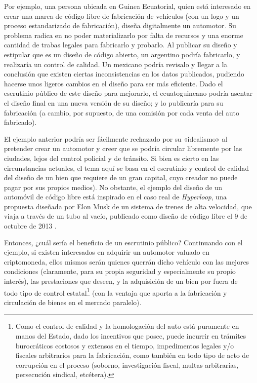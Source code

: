 \documentclass[12pt,a4paper]{article}
\begin{document}
Por ejemplo, una persona ubicada en Guinea Ecuatorial, quien está interesado en crear una marca de código libre de fabricación de vehículos (con un logo y un proceso estandarizado de fabricación), diseña digitalmente un automotor. Su problema radica en no poder materializarlo por falta de recursos y una enorme cantidad de trabas legales para fabricarlo y probarlo. Al publicar su diseño y estipular que es un diseño de código abierto, un argentino podría fabricarlo, y realizaría un control de calidad. Un mexicano podría revisalo y llegar a la conclusión que existen ciertas inconsistencias en los datos publicados, pudiendo hacerse unos ligeros cambios en el diseño para ser más eficiente. Dado el escrutinio público de este diseño para mejorarlo, el ecuatoguineano podría asentar el diseño final en una nueva versión de su diseño; y lo publicaría para su fabricación (a cambio, por supuesto, de una comisión por cada venta del auto fabricado).

El ejemplo anterior podría ser fácilmente rechazado por su «idealismo» al pretender crear un automotor y creer que se podría circular libremente por las ciudades, lejos del control policial y de tránsito. Si bien es cierto en las circunstancias actuales, el tema aquí se basa en el escrutinio y control de calidad del diseño de un bien que requiere de un gran capital, cuyo creador no puede pagar por sus propios medios). No obstante, el ejemplo del diseño de un automóvil de código libre está inspirado en el caso real de \textit{Hyperloop}, una propuesta diseñada por Elon Musk de un sistema de trenes de alta velocidad, que viaja a través de un tubo al vacío, publicado como diseño de código libre el 9 de octubre de 2013 \cite{hyperloop}.

Entonces, ¿cuál sería el beneficio de un escrutinio público? Continuando con el ejemplo, si existen interesados en adquirir un automotor valuado en criptomoneda, ellos mismos serán quienes querrán dicho vehículo con las mejores condiciones (claramente, para su propia seguridad y especialmente su propio interés), las prestaciones que deseen, y la adquisición de un bien por fuera de todo tipo de control estatal\footnote{Como el control de calidad y la homologación del auto está puramente en manos del Estado, dado los incentivos que posee, puede incurrir en trámites burocráticos costosos y extensos en el tiempo, impedimentos legales y/o fiscales arbitrarios para la fabricación, como también en todo tipo de acto de corrupción en el proceso (soborno, investigación fiscal, multas arbitrarias, persecución sindical, etcétera).} (con la ventaja que aporta a la fabricación y circulación de bienes en el mercado paralelo).
\end{document}
